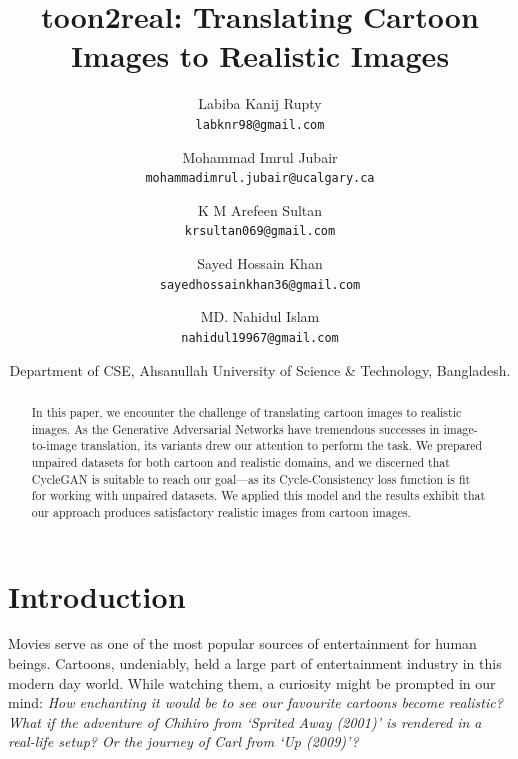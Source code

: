 \documentclass[10pt,twocolumn,letterpaper]{article}
\begin{document}
\title{toon2real: Translating Cartoon Images to Realistic Images}

\author{Labiba Kanij Rupty \\ {\tt\small labknr98@gmail.com} 
\and Mohammad Imrul Jubair \\ {\tt\small mohammadimrul.jubair@ucalgary.ca}
\and K M Arefeen Sultan \\ {\tt\small krsultan069@gmail.com}
\and Sayed Hossain Khan \\ {\tt\small sayedhossainkhan36@gmail.com}
\and MD. Nahidul Islam \\ {\tt\small nahidul19967@gmail.com}
\\
\and Department of CSE, Ahsanullah University of Science \& Technology, Bangladesh.
} 

\maketitle

\begin{abstract}
In this paper, we encounter the challenge of translating cartoon images to realistic images. As the Generative Adversarial Networks have tremendous successes in image-to-image translation, its variants drew our attention to perform the task. We prepared unpaired datasets for both cartoon and realistic domains, and we discerned that CycleGAN is suitable to reach our goal---as its Cycle-Consistency loss function is fit for working with unpaired datasets.
We applied this model and the results exhibit that our approach produces satisfactory realistic images from cartoon images.

\end{abstract}

\section{Introduction}
Movies 
serve
as one of the most popular sources of entertainment for human beings. Cartoons, undeniably, held a large part of entertainment industry in this modern day world.
While watching them,
a curiosity might be prompted in our mind:
\textit{How enchanting it would be to see our favourite cartoons become realistic? What if the adventure of Chihiro from \textit{`Sprited Away (2001)'} is rendered in a real-life setup?
Or the journey of Carl from \textit{`Up (2009)'}?}
\end{document}
